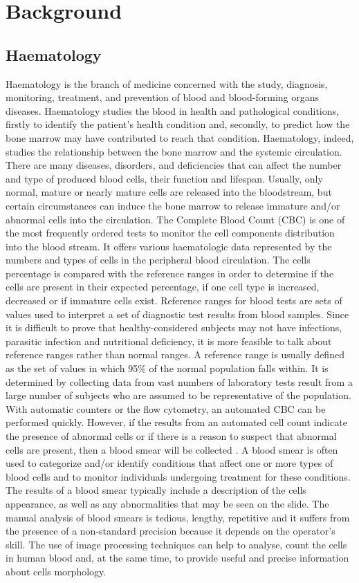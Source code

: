 \documentclass[final,a4paper,12pt,english]{UnicaPhdThesis3}
\begin{document}
	\chapter{Background}
	
	\section{Haematology} %
	Haematology is the branch of medicine concerned with the study, diagnosis, monitoring, treatment, and prevention of blood and blood-forming organs diseases. Haematology studies the blood in health and pathological conditions, firstly to identify the patient’s health condition and, secondly, to predict how the bone marrow may have contributed to reach that condition. 
	Haematology, indeed, studies the relationship between the bone marrow and the systemic circulation. There are many diseases, disorders, and deficiencies that can affect the number and type of produced blood cells, their function and lifespan. Usually, only normal, mature or nearly mature cells are released into the bloodstream, but certain circumstances can induce the bone marrow to release immature and/or abnormal cells into the circulation. The Complete Blood Count (CBC) is one of the most frequently ordered tests to monitor the cell components distribution into the blood stream. It offers various haematologic data represented by the numbers and types of cells in the peripheral blood circulation. The cells percentage is compared with the reference ranges in order to determine if the cells are present in their expected percentage, if one cell type is increased, decreased or if immature cells exist. Reference ranges for blood tests are sets of values used to interpret a set of diagnostic test results from blood samples. Since it is difficult to prove that healthy-considered subjects may not have infections, parasitic infection and nutritional deficiency, it is more feasible to talk about reference ranges rather than normal ranges. A reference range is usually defined as the set of values in which 95\% of the normal population falls within. It is determined by collecting data from vast numbers of laboratory tests result from a large number of subjects who are assumed to be representative of the population. With automatic counters or the flow cytometry, an automated CBC can be performed quickly. However, if the results from an automated cell count indicate the presence of abnormal cells or if there is a reason to suspect that abnormal cells are present, then a blood smear will be collected \cite{Loddo2016}. A blood smear is often used to categorize and/or identify conditions that affect one or more types of blood cells and to monitor individuals undergoing treatment for these conditions. The results of a blood smear typically include a description of the cells appearance, as well as any abnormalities that may be seen on the slide. The manual analysis of blood smears is tedious, lengthy, repetitive and it suffers from the presence of a non-standard precision because it depends on the operator's skill. The use of image processing techniques can help to analyse, count the cells in human blood and, at the same time, to provide useful and precise information about cells morphology.
\end{document}
